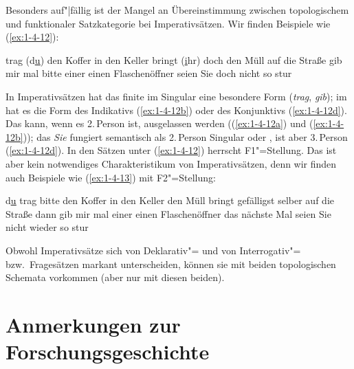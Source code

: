 \documentclass[output=paper]{langsci/langscibook}
\begin{document}
Besonders auf"|fällig ist der Mangel an Übereinstimmung zwischen topologischem
 und funktionaler Satzkategorie bei Imperativsätzen. Wir finden Beispiele
wie (\ref{ex:1-4-12}):
\begin{exe}
\ex\label{ex:1-4-12}
\begin{xlist}
\ex\label{ex:1-4-12a} trag (d\underline{\underline{u}}) den Koffer in den Keller
\ex\label{ex:1-4-12b} bringt (\underline{\underline{i}}hr) doch den Müll auf die Straße
\ex\label{ex:1-4-12c} gib mir mal bitte einer einen Flaschenöffner
\ex\label{ex:1-4-12d} seien Sie doch nicht so stur
\end{xlist}
\end{exe}
In Imperativsätzen hat das finite  im Singular eine besondere Form (\textit{trag},
\textit{gib}); im  hat es die Form des Indikativs (\ref{ex:1-4-12b}) oder des Konjunktivs (\ref{ex:1-4-12d}). Das  kann, wenn es  2.\,Person ist, ausgelassen werden ((\ref{ex:1-4-12a}) und (\ref{ex:1-4-12b}));
das  \textit{Sie} fungiert semantisch als 2.\,Person Singular oder
, ist  aber 3.\,Person  (\ref{ex:1-4-12d}). In den Sätzen unter (\ref{ex:1-4-12}) herrscht
F1"=Stellung. Das ist aber kein notwendiges Charakteristikum von Imperativsätzen,
denn wir finden auch Beispiele wie (\ref{ex:1-4-13}) mit F2"=Stellung:
\begin{exe}
\ex\label{ex:1-4-13}
\begin{xlist}
\ex\label{ex:1-4-13a}  d\underline{\underline{u}} trag bitte den Koffer in den Keller
\ex\label{ex:1-4-13b} den Müll bringt gefälligst selber auf die Straße
\ex\label{ex:1-4-13c} dann gib mir mal einer einen Flaschenöffner
\ex\label{ex:1-4-13d} das nächste Mal seien Sie nicht wieder so stur
\end{xlist}
\end{exe}
Obwohl Imperativsätze sich von Deklarativ"= und von Interrogativ"= bzw.\ Fragesätzen 
markant unterscheiden, können sie mit beiden topologischen Schemata vorkommen
(aber nur mit diesen beiden).
\section{Anmerkungen zur Forschungsgeschichte}%
\label{sec:1-5}
\end{document}
